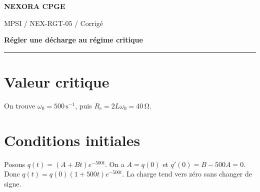 \documentclass[11pt,a4paper]{article}
\begin{document}
{\small\bfseries\color{nexorablue} NEXORA CPGE}\par
{\small MPSI / NEX-RGT-05 / Corrigé}\par
{\LARGE\bfseries Régler une décharge au régime critique}\par
\vspace{0.25em}\hrule\vspace{0.6em}

\section*{Valeur critique}
On trouve $\omega_0=500\,\mathrm{s^{-1}}$, puis $R_c=2L\omega_0=40\,\mathrm\Omega$.

\section*{Conditions initiales}
Posons $q(t)=(A+Bt)e^{-500t}$. On a $A=q(0)$ et $q'(0)=B-500A=0$. Donc $q(t)=q(0)(1+500t)e^{-500t}$. La charge tend vers zéro sans changer de signe.
\end{document}
